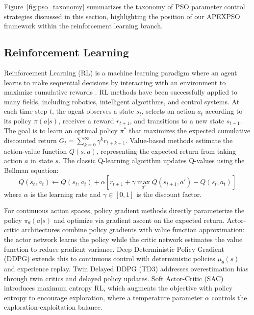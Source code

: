 \documentclass[fleqn,10pt]{wlscirep}
\begin{document}
Figure~\ref{fig:pso_taxonomy} summarizes the taxonomy of PSO parameter control strategies discussed in this section, highlighting the position of our APEXPSO framework within the reinforcement learning branch.

\subsection*{Reinforcement Learning}

Reinforcement Learning (RL) is a machine learning paradigm where an agent learns to make sequential decisions by interacting with an environment to maximize cumulative rewards \cite{sutton2018rl}.
RL methods have been successfully applied to many fields, including robotics, intelligent algorithms, and control systems.
At each time step $t$, the agent observes a state $s_t$, selects an action $a_t$ according to its policy $\pi(a|s)$, receives a reward $r_{t+1}$, and transitions to a new state $s_{t+1}$.
The goal is to learn an optimal policy $\pi^*$ that maximizes the expected cumulative discounted return $G_t = \sum_{k=0}^{\infty} \gamma^k r_{t+k+1}$.
Value-based methods estimate the action-value function $Q(s,a)$, representing the expected return from taking action $a$ in state $s$.
The classic Q-learning algorithm \cite{watkins1992qlearning} updates Q-values using the Bellman equation:
\begin{equation}
Q(s_t, a_t) \leftarrow Q(s_t, a_t) + \alpha \left[r_{t+1} + \gamma \max_{a'} Q(s_{t+1}, a') - Q(s_t, a_t)\right]
\label{eq:qlearning_update}
\end{equation}
where $\alpha$ is the learning rate and $\gamma \in [0,1]$ is the discount factor.

For continuous action spaces, policy gradient methods directly parameterize the policy $\pi_\theta(a|s)$ and optimize via gradient ascent on the expected return.
Actor-critic architectures combine policy gradients with value function approximation: the actor network learns the policy while the critic network estimates the value function to reduce gradient variance.
Deep Deterministic Policy Gradient (DDPG) \cite{lillicrap2016ddpg} extends this to continuous control with deterministic policies $\mu_\theta(s)$ and experience replay.
Twin Delayed DDPG (TD3) \cite{fujimoto2018td3} addresses overestimation bias through twin critics and delayed policy updates.
Soft Actor-Critic (SAC) \cite{haarnoja2018sac} introduces maximum entropy RL, which augments the objective with policy entropy to encourage exploration, where a temperature parameter $\alpha$ controls the exploration-exploitation balance.
\end{document}
